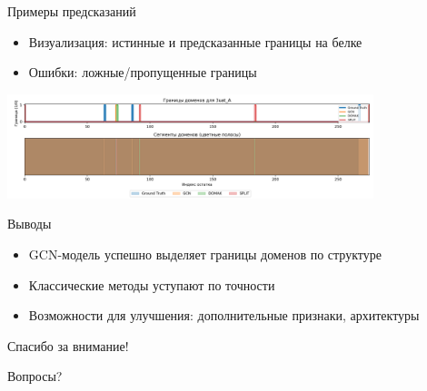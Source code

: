 \documentclass{beamer}
\begin{document}
\begin{frame}{Примеры предсказаний}
  \begin{itemize}
    \item Визуализация: истинные и предсказанные границы на белке
    \item Ошибки: ложные/пропущенные границы
  \end{itemize}
  \includegraphics[width=0.8\textwidth]{example_pred.png} %
\end{frame}

\begin{frame}{Выводы}
  \begin{itemize}
    \item GCN-модель успешно выделяет границы доменов по структуре
    \item Классические методы уступают по точности
    \item Возможности для улучшения: дополнительные признаки, архитектуры
  \end{itemize}
\end{frame}

\begin{frame}{Спасибо за внимание!}
  \begin{center}
    Вопросы?
  \end{center}
\end{frame}
\end{document}
